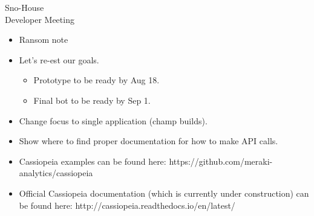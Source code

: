 \documentclass{article}
\begin{document}
\begin{Minutes}{Sno-House\\Developer Meeting}


\missingNoExcuse{%
}




\maketitle

\begin{itemize}
	\item Ransom note
\end{itemize}

\begin{itemize}
	\item Let's re-est our goals.
	\begin{itemize}
		\item Prototype to be ready by Aug 18.
		\item Final bot to be ready by Sep 1.
	\end{itemize}
	\item Change focus to single application (champ builds).
\end{itemize}

\begin{itemize}
	\item Show where to find proper documentation for how to make API calls.
	\item Cassiopeia examples can be found here: {https://github.com/meraki-analytics/cassiopeia}
	\item Official Cassiopeia documentation (which is currently under construction) can be found here: {http://cassiopeia.readthedocs.io/en/latest/}
\end{itemize}


\thispagestyle{creditfooter}

\end{Minutes}
\end{document}
